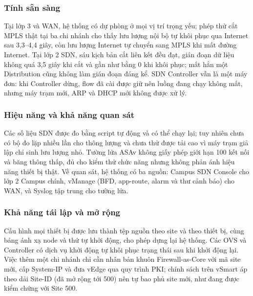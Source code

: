 \subsubsection{Tính sẵn sàng}

Tại lớp 3 và WAN, hệ thống có dự phòng ở mọi vị trí trọng yếu; phép thử cắt MPLS thật tại ba chi nhánh cho thấy lưu lượng nội bộ tự khôi phục qua Internet sau 3,3--4,4 giây, còn lưu lượng Internet tự chuyển sang MPLS khi mất đường Internet. Tại lớp 2 SDN, sáu kịch bản cắt liên kết đều đạt, gián đoạn dữ liệu không quá 3,5 giây khi cắt và gần như bằng 0 khi khôi phục; mất hẳn một Distribution cũng không làm gián đoạn đáng kể. SDN Controller vẫn là một máy đơn: khi Controller dừng, flow đã cài được giữ nên luồng đang chạy không mất, nhưng máy trạm mới, ARP và DHCP mới không được xử lý.

\subsubsection{Hiệu năng và khả năng quan sát}

Các số liệu SDN được đo bằng script tự động và có thể chạy lại; tuy nhiên chưa có bộ đo lặp nhiều lần cho thông lượng và chưa thử được tải cao vì máy trạm giả lập chỉ sinh lưu lượng nhỏ. Tường lửa ASAv không giấy phép giới hạn 100 kết nối và băng thông thấp, đủ cho kiểm thử chức năng nhưng không phản ánh hiệu năng thiết bị thật. Về quan sát, hệ thống có ba nguồn: Campus SDN Console cho lớp 2 Campus chính, vManage (BFD, app-route, alarm và thư cảnh báo) cho WAN, và Syslog tập trung cho tường lửa.

\subsubsection{Khả năng tái lập và mở rộng}

Cấu hình mọi thiết bị được lưu thành tệp nguồn theo site và theo thiết bị, cùng bảng ánh xạ node và thứ tự khởi động, cho phép dựng lại hệ thống. Các OVS và Controller có dịch vụ khởi động tự khôi phục trạng thái sau khi khởi động lại. Việc thêm một chi nhánh chỉ cần nhân bản khuôn Firewall-as-Core với mã site mới, cấp System-IP và đưa vEdge qua quy trình PKI; chính sách trên vSmart áp theo dải Site-ID (đã mở rộng tới 500) nên tự bao phủ site mới, như đang được kiểm chứng với Site 500.
